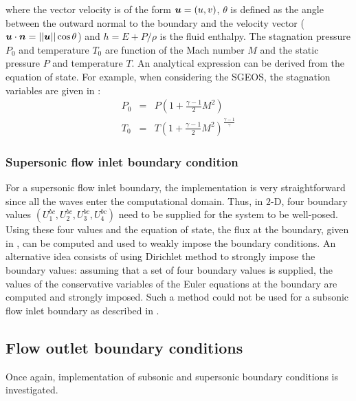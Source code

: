 %    
where the vector velocity is of the form $\boldsymbol u = \left( u,v \right)$, $\theta$ is defined as the angle between the outward normal to the boundary and the velocity vector ($\boldsymbol u \cdot \boldsymbol n = || \boldsymbol u || \cos \theta$) and $h = E + P / \rho$ is the fluid enthalpy. The stagnation pressure $P_0$ and temperature $T_0$ are function of the Mach number $M$ and the static pressure $P$ and temperature $T$. An analytical expression can be derived from the equation of state. For example, when considering the SGEOS, the stagnation variables are given in  \cite{SEM}:
\begin{eqnarray}\label{eq:stag_bc_sct3}
P_0 &=& P \left( 1 + \frac{\gamma-1}{2}M^2 \right)\\
T_0 &=& T \left( 1 + \frac{\gamma-1}{2}M^2 \right)^{\frac{\gamma-1}{\gamma}}
\end{eqnarray}   
\subsubsection{Supersonic flow inlet boundary condition} \label{sec:sup-flow-inlet-bc}
For a supersonic flow inlet boundary, the implementation is very straightforward since all the waves enter the computational domain. Thus, in $2$-D, four boundary values $\left(U_1^{bc}, U_2^{bc}, U_3^{bc}, U_4^{bc}\right)$ need to be supplied for the system to be well-posed. Using these four values and the equation of state, the flux at the boundary, given in , can be computed and used to weakly impose the boundary conditions. An alternative idea consists of using Dirichlet method to strongly impose the boundary values: assuming that a set of four boundary values is supplied, the values of the conservative variables of the Euler equations at the boundary are computed and strongly imposed. Such a method could not be used for a subsonic flow inlet boundary as described in .
\subsection{Flow outlet boundary conditions} \label{sec:flow-outlet-bc}
Once again, implementation of subsonic and supersonic boundary conditions is investigated.
